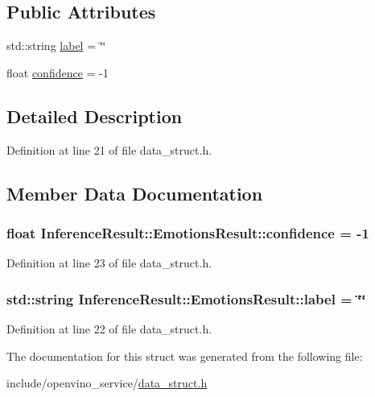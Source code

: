 \subsection*{Public Attributes}
\begin{DoxyCompactItemize}
\item 
std\+::string \hyperlink{structInferenceResult_1_1EmotionsResult_a273570a13673f51115a9de954cb0d333}{label} = \char`\"{}\char`\"{}
\item 
float \hyperlink{structInferenceResult_1_1EmotionsResult_aec1805367ebc6acda383d180a3cc896e}{confidence} = -\/1
\end{DoxyCompactItemize}


\subsection{Detailed Description}


Definition at line 21 of file data\+\_\+struct.\+h.



\subsection{Member Data Documentation}
\subsubsection[{\texorpdfstring{confidence}{confidence}}]{\setlength{\rightskip}{0pt plus 5cm}float Inference\+Result\+::\+Emotions\+Result\+::confidence = -\/1}\hypertarget{structInferenceResult_1_1EmotionsResult_aec1805367ebc6acda383d180a3cc896e}{}\label{structInferenceResult_1_1EmotionsResult_aec1805367ebc6acda383d180a3cc896e}


Definition at line 23 of file data\+\_\+struct.\+h.

\subsubsection[{\texorpdfstring{label}{label}}]{\setlength{\rightskip}{0pt plus 5cm}std\+::string Inference\+Result\+::\+Emotions\+Result\+::label = \char`\"{}\char`\"{}}\hypertarget{structInferenceResult_1_1EmotionsResult_a273570a13673f51115a9de954cb0d333}{}\label{structInferenceResult_1_1EmotionsResult_a273570a13673f51115a9de954cb0d333}


Definition at line 22 of file data\+\_\+struct.\+h.



The documentation for this struct was generated from the following file\+:\begin{DoxyCompactItemize}
\item 
include/openvino\+\_\+service/\hyperlink{data__struct_8h}{data\+\_\+struct.\+h}\end{DoxyCompactItemize}
